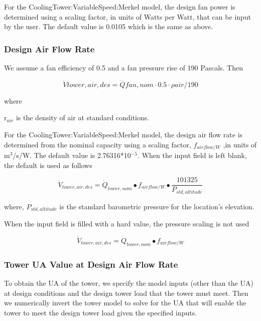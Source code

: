 For the CoolingTower:VariableSpeed:Merkel model, the design fan power is determined using a scaling factor, in units of Watts per Watt, that can be input by the user. The default value is 0.0105 which is the same as above.

\subsubsection{Design Air Flow Rate}\label{design-air-flow-rate}

We assume a fan efficiency of 0.5 and a fan pressure rise of 190 Pascals. Then

\begin{equation}
\dot Vtower,air,des = \dot Qfan,nom\cdot 0.5\cdot \rho air/190
\end{equation}

where

r\(_{air}\) is the density of air at standard conditions.

For the CoolingTower:VariableSpeed:Merkel model, the design air flow rate is determined from the nominal capacity using a scaling factor, \({f_{airflow/W}}\) ,in units of m\(^{3}\)/s/W. The default value is 2.76316*10\(^{-5}\). When the input field is left blank, the default is used as follows

\begin{equation}
{\dot V_{tower,air,des}} = {\dot Q_{tower,nom}} \bullet {f_{airflow/W}} \bullet \frac{{101325}}{{{P_{std,altitude}}}}
\end{equation}

where, \({P_{std,altitude}}\) is the standard barometric pressure for the location's elevation.

When the input field is filled with a hard value, the pressure scaling is not used

\begin{equation}
{\dot V_{tower,air,des}} = {\dot Q_{tower,nom}} \bullet {f_{airflow/W}}
\end{equation}

\subsubsection{Tower UA Value at Design Air Flow Rate}\label{tower-ua-value-at-design-air-flow-rate}

To obtain the UA of the tower, we specify the model inputs (other than the UA) at design conditions and the design tower load that the tower must meet. Then we numerically invert the tower model to solve for the UA that will enable the tower to meet the design tower load given the specified inputs.

